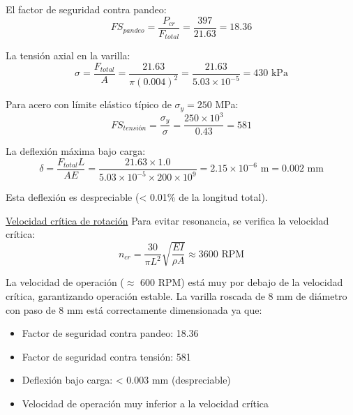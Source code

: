 El factor de seguridad contra pandeo:
\begin{equation}
FS_{pandeo} = \frac{P_{cr}}{F_{total}} = \frac{397}{21.63} = 18.36
\end{equation}

La tensión axial en la varilla:
\begin{equation}
\sigma = \frac{F_{total}}{A} = \frac{21.63}{\pi (0.004)^2} = \frac{21.63}{5.03 \times 10^{-5}} = 430 \text{ kPa}
\end{equation}

Para acero con límite elástico típico de $\sigma_y = 250$ MPa:
\begin{equation}
FS_{tensión} = \frac{\sigma_y}{\sigma} = \frac{250 \times 10^3}{0.43} = 581
\end{equation}

La deflexión máxima bajo carga:
\begin{equation}
\delta = \frac{F_{total} L}{A E} = \frac{21.63 \times 1.0}{5.03 \times 10^{-5} \times 200 \times 10^9} = 2.15 \times 10^{-6} \text{ m} = 0.002 \text{ mm}
\end{equation}

Esta deflexión es despreciable (< 0.01\% de la longitud total).

\underline{Velocidad crítica de rotación}
Para evitar resonancia, se verifica la velocidad crítica:
\begin{equation}
n_{cr} = \frac{30}{\pi L^2} \sqrt{\frac{E I}{\rho A}} \approx 3600 \text{ RPM}
\end{equation}

La velocidad de operación ($\approx$ 600 RPM) está muy por debajo de la velocidad crítica, garantizando operación estable.
La varilla roscada de 8 mm de diámetro con paso de 8 mm está correctamente dimensionada ya que:
\begin{itemize}[label=$\bullet$]
        \item Factor de seguridad contra pandeo: 18.36
        \item Factor de seguridad contra tensión: 581
        \item Deflexión bajo carga: < 0.003 mm (despreciable)
        \item Velocidad de operación muy inferior a la velocidad crítica
\end{itemize}
